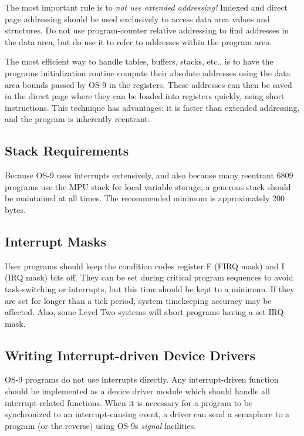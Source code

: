 \documentclass[
]{article}
\begin{document}
The most important rule is to \emph{not use extended addressing!}
Indexed and direct page addressing should be used exclusively to access
data area values and structures. Do not use program-counter relative
addressing to find addresses in the data area, but do use it to refer to
addresses within the program area.

The most efficient way to handle tables, buffers, stacks, etc., is to
have the program\textquotesingle s initialization routine compute their
absolute addresses using the data area bounds passed by OS-9 in the
registers. These addresses can then be saved in the direct page where
they can be loaded into registers quickly, using short instructions.
This technique has advantages: it is faster than extended addressing,
and the program is inherently reentrant.

\subsection{Stack Requirements}

Because OS-9 uses interrupts extensively, and also because many
reentrant 6809 programs use the MPU stack for local variable storage, a
generous stack should be maintained at all times. The recommended
minimum is approximately 200 bytes.

\subsection{Interrupt Masks}

User programs should keep the condition codes register F (FIRQ mask) and
I (IRQ mask) bits off. They can be set during critical program sequences
to avoid task-switching or interrupts, but this time should be kept to a
minimum. If they are set for longer than a tick period, system
timekeeping accuracy may be affected. Also, some Level Two systems will
abort programs having a set IRQ mask.

\subsection{Writing Interrupt-driven Device Drivers}

OS-9 programs do not use interrupts directly. Any interrupt-driven
function should be implemented as a device driver module which should
handle all interrupt-related functions. When it is necessary for a
program to be synchronized to an interrupt-causing event, a driver can
send a semaphore to a program (or the reverse) using
OS-9\textquotesingle s \emph{signal} facilities.
\end{document}
